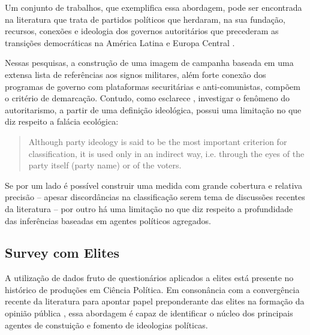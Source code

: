 \documentclass[
12pt,				%
openright,			%
twoside,			%
a4paper,			%
english,			%
french,				%
spanish,			%
brazil				%
]{abntex2}
\begin{document}
Um conjunto de trabalhos, que exemplifica essa abordagem, pode ser encontrada na literatura que trata de partidos políticos que herdaram, na sua fundação, recursos, conexões e ideologia dos governos autoritários que precederam as transições democráticas na América Latina \cite{loxton2015authoritarian, loxton2014authoritarian, lyons2016victorious, loxton2015authoritarian} e Europa Central \cite{grzymala2006authoritarian}. 

Nessas pesquisas, a construção de uma imagem de campanha baseada em uma extensa lista de referências aos signos militares, além forte conexão dos programas de governo com plataformas securitárias e anti-comunistas, compõem o critério de demarcação. Contudo, como esclarece , investigar o fenômeno do autoritarismo, a partir de uma definição ideológica, possui uma limitação no que diz respeito a falácia ecológica:

\begin{samepage}
	\begin{quote}
		Although party ideology is said to be the most important criterion for classification, it is used only in an indirect way, i.e. through the eyes of the party itself (party name) or of the voters. \cite{mudde2000ideology}
	\end{quote}
\end{samepage}

Se por um lado é possível construir uma medida com grande cobertura e relativa precisão -- apesar discordâncias na classificação serem tema de discussões recentes da literatura \cite{glasius2018authoritarianism, mudde2016introduction} -- por outro há uma limitação no que diz respeito a profundidade das inferências baseadas em agentes políticos agregados.

\vspace{2cm}

\subsection{Survey com Elites}

A utilização de dados fruto de questionários aplicados a elites está presente no histórico de produções em Ciência Política\cite{hoffmann2007methods, andreadis2017elite}. Em consonância com a convergência recente da literatura para apontar papel preponderante das elites na formação da opinião pública \cite{zaller1992nature, gabel2007estimating, achen2017democracy}, essa abordagem é capaz de identificar o núcleo dos principais agentes de constuição e fomento de ideologias políticas.
\end{document}
